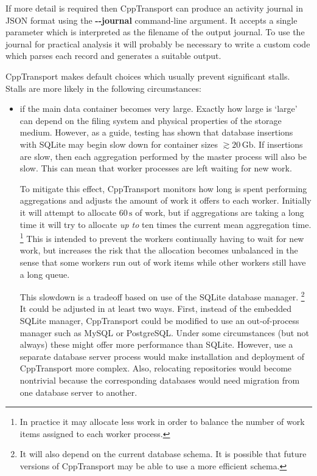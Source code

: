 \documentclass[11pt,a4paper]{article}
\renewcommand{\texttt}[1]{{\ttfamily\fontseries{l}\selectfont{#1}}}
\newcommand{\packagefont}{\sffamily}
\newcommand{\CppTransport}{{\packagefont CppTransport}}
\newcommand{\SQLite}{{\packagefont SQLite}}
\newcommand{\file}[1]{\texttt{{#1}}}
\newcommand{\option}[1]{{\ttfamily\bfseries\small #1}}
\newcommand{\Gb}{\,\mathrm{Gb}}
\newcommand{\second}{\,\mathrm{s}}
\newcommand{\semibold}[1]{{\fontseries{b}\selectfont{#1}}}
\newcommand{\para}[1]{\par\vspace{2mm}\noindent\semibold{{#1.}---}\ignorespaces}
\begin{document}
If more detail is required then {\CppTransport} can produce an activity
journal in JSON format using the
\option{{-}{-}journal} command-line argument.
It accepts a single parameter which is interpreted as the filename of the
output journal.
To use the journal for practical analysis it will probably be necessary
to write a custom code which parses each record and generates a suitable output.

\para{Avoiding stalls}
{\CppTransport} makes default choices which usually prevent significant stalls.
Stalls are more likely in the following circumstances:
\begin{itemize}
    \item if the main data container \file{data.sqlite} becomes very large.
    Exactly how large is `large' can depend on the filing system and
    physical properties of the storage medium.
    However, as a guide, testing has shown that
    database insertions with {\SQLite}
    may begin slow down for container sizes $\gtrsim 20 \Gb$.
    If insertions are slow, then each aggregation performed by the master
    process will also be slow.
    This can mean that worker processes are left waiting
    for new work.
    
    To mitigate this effect, {\CppTransport} monitors how long is spent
    performing aggregations and adjusts the amount of work it offers
    to each worker.
    Initially it will attempt to allocate $60\second$ of work,
    but if aggregations are taking a long time
    it will try to allocate \emph{up to}
    ten times the current mean aggregation time.%
        \footnote{In practice it may allocate less work in order to balance the
        number of work items assigned to each worker process.}
    This is intended to prevent the workers continually having to wait for
    new work, but increases the risk that the allocation becomes unbalanced
    in the sense that some workers run out of work items while other workers
    still have a long queue.
    
    This slowdown is a tradeoff based on use of the {\SQLite} database manager.%
        \footnote{It will also depend on the current database schema.
        It is possible that
        future versions of {\CppTransport} may be able to use a more
        efficient schema.}
    It could be adjusted in at least two ways. First, instead of the embedded
    {\SQLite} manager, {\CppTransport} could be modified to use an out-of-process
    manager such as MySQL or PostgreSQL.
    Under some circumstances (but not always) these might offer more
    performance than {\SQLite}.
    However,
    use a separate database server process
    would make installation and deployment of {\CppTransport} more complex.
    Also, relocating repositories would become nontrivial because the
    corresponding databases would need migration
    from one database server to another.
    

\end{itemize}
\end{document}
